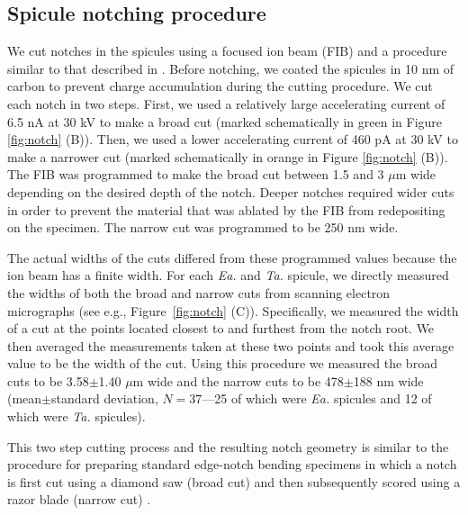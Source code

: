 \documentclass[12pt,onecolumn]{article}
\makeatletter
\newcommand{\TA}{\textit{Ta.\@}\xspace}
\newcommand{\EA}{\textit{Ea.\@}\xspace}
\makeatother
\begin{document}
\begin{bibunit}
\subsection{Spicule notching procedure}
\label{sec:notchconfig}
We cut notches in the spicules using a focused ion beam (FIB) and a procedure similar to that described in \cite{jaya2015can}. Before notching, we coated the spicules in 10 nm of carbon to prevent charge accumulation during the cutting procedure. We cut each notch in two steps. First, we used a relatively large accelerating current of 6.5 nA at 30 kV to make a broad cut (marked schematically in green in Figure \ref{fig:notch} (B)). Then, we used a lower accelerating current of 460 pA at 30 kV to make a narrower cut (marked schematically in orange in Figure \ref{fig:notch} (B)). The FIB was programmed to make the broad cut between 1.5 and 3 $\mu$m wide depending on the desired depth of the notch. Deeper notches required wider cuts in order to prevent the material that was ablated by the FIB from redepositing on the specimen. The narrow cut was programmed to be 250 nm wide. 

The actual widths of the cuts differed from these programmed values because the ion beam has a finite width. For each \EA and \TA spicule, we directly measured the widths of both the broad and narrow cuts from scanning electron micrographs (see e.g., Figure~\ref{fig:notch} (C)). Specifically, we measured the width of a cut at the points located closest to and furthest from the notch root. We then averaged the measurements taken at these two points and took this average value to be the width of the cut. Using this procedure we measured the broad cuts to be 3.58$\pm$1.40 $\mu$m wide and the narrow cuts to be 478$\pm$188 nm wide (mean$\pm$standard deviation, $N=37$---25 of which were \EA spicules and 12 of which were \TA spicules).

This two step cutting process and the resulting notch geometry is similar to the procedure for preparing standard edge-notch bending specimens in which a notch is first cut using a diamond saw (broad cut) and then subsequently scored using a razor blade (narrow cut) \cite{rocha2006effect,kubler1997fracture,damani1996critical}.


\end{bibunit}
\end{document}
